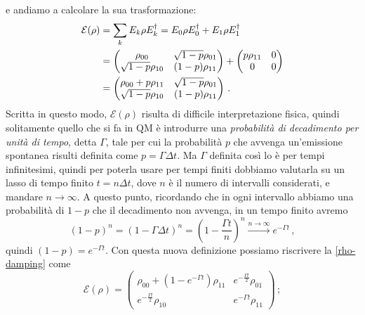 e andiamo a calcolare la sua trasformazione:
\begin{align}
    \mathcal{E}(\rho) &= \sum_k E_k \rho E_k^\dagger = E_0\rho E_0^\dagger + E_1\rho E_1^\dagger \notag \\
    &= \begin{pmatrix}
            \rho_{00} & \sqrt{1-p} \rho_{01} \\
            \sqrt{1-p}\rho_{10} & (1-p)\rho_{11}
        \end{pmatrix}
        +
        \begin{pmatrix}
            p\rho_{11} & 0 \\
            0 & 0
        \end{pmatrix} \notag \\
    &= \begin{pmatrix}
            \rho_{00}+p\rho_{11} & \sqrt{1-p}\rho_{01} \\
            \sqrt{1-p}\rho_{10} & (1-p)\rho_{11}
        \end{pmatrix}  \, . \label{rho-damping}
\end{align}
Scritta in questo modo, $\mathcal{E}(\rho)$ risulta di difficile interpretazione fisica, quindi solitamente quello che si fa in QM è introdurre una \textit{probabilità di decadimento per unità di tempo}, detta $\Gamma$, tale per cui la probabilità $p$ che avvenga un'emissione spontanea risulti definita come $p=\Gamma \Delta t$. Ma $\Gamma$ definita così lo è per tempi infinitesimi, quindi per poterla usare per tempi finiti dobbiamo valutarla su un lasso di tempo finito $t = n \Delta t$, dove $n$ è il numero di intervalli considerati, e mandare $n \to \infty$. A questo punto, ricordando che in ogni intervallo abbiamo una probabilità di $1-p$ che il decadimento non avvenga, in un tempo finito avremo
\begin{equation*}
    (1-p)^n = \left(1- \Gamma \Delta t \right)^n = \left(1-\frac{\Gamma t}{n}\right)^n \overset{n \to \infty}{\longrightarrow} e^{-\Gamma t} \, ,
\end{equation*}
quindi $(1-p) = e^{-\Gamma t}$. Con questa nuova definizione possiamo riscrivere la \eqref{rho-damping} come
\begin{equation}\label{rho-damping2}
    \mathcal{E}(\rho) = \begin{pmatrix}
                            \rho_{00}+(1-e^{-\Gamma t})\rho_{11} & e^{-\frac{\Gamma t}{2}}\rho_{01} \\
                            e^{-\frac{\Gamma t}{2}}\rho_{10} & e^{-\Gamma t}\rho_{11}
                        \end{pmatrix} \, ;
\end{equation}
